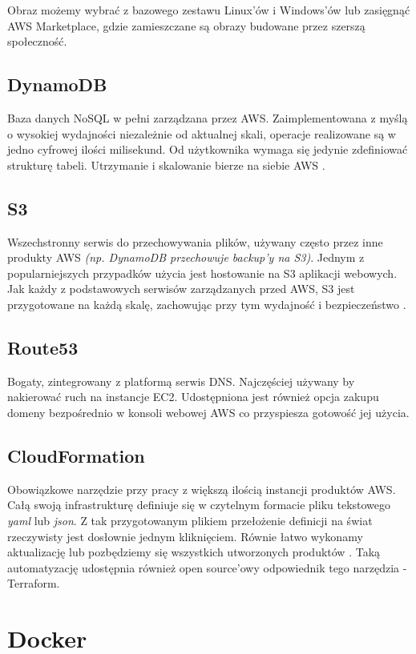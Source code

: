 Obraz możemy wybrać z bazowego zestawu Linux'ów i Windows'ów lub zasięgnąć AWS Marketplace, gdzie zamieszczane są obrazy budowane przez szerszą społeczność.

\subsection{DynamoDB}
Baza danych NoSQL w pełni zarządzana przez AWS. 
Zaimplementowana z myślą o wysokiej wydajności niezależnie od aktualnej skali, operacje realizowane są w jedno cyfrowej ilości milisekund.
Od użytkownika wymaga się jedynie zdefiniować strukturę tabeli. Utrzymanie i skalowanie bierze na siebie AWS \cite{AWS-O}.

\subsection{S3}
Wszechstronny serwis do przechowywania plików, używany często przez inne produkty AWS {\em (np. DynamoDB przechowuje backup'y na S3)}. 
Jednym z popularniejszych przypadków użycia jest hostowanie na S3 aplikacji webowych. 
Jak każdy z podstawowych serwisów zarządzanych przed AWS, S3 jest przygotowane na każdą skalę, zachowując przy tym wydajność i bezpieczeństwo \cite{AWS-O}.

\subsection{Route53}
Bogaty, zintegrowany z platformą serwis DNS. Najczęściej używany by nakierować ruch na instancje EC2. 
Udostępniona jest również opcja zakupu domeny bezpośrednio w konsoli webowej AWS co przyspiesza gotowość jej użycia.

\subsection{CloudFormation}
Obowiązkowe narzędzie przy pracy z większą ilością instancji produktów AWS. 
Całą swoją infrastrukturę definiuje się w czytelnym formacie pliku tekstowego {\em yaml} lub {\em json}.
Z tak przygotowanym plikiem przełożenie definicji na świat rzeczywisty jest dosłownie jednym kliknięciem. 
Równie łatwo wykonamy aktualizację lub pozbędziemy się wszystkich utworzonych produktów \cite{AWS-O}.
Taką automatyzację udostępnia również open source'owy odpowiednik tego narzędzia - Terraform.


\section{Docker}

